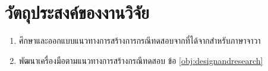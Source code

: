 \section{วัตถุประสงค์ของงานวิจัย}
\label{sec:objective}

\begin{enumerate}
    \item ศึกษาและออกแบบแนวทางการสร้างการกรณีทดสอบจาก{\TestPath}ที่ได้จาก{\scg}สำหรับภาษาจาวา\label{obj:designandresearch}
    \item พัฒนาเครื่องมือตามแนวทางการสร้างกรณีทดสอบ ข้อ \ref{obj:designandresearch}
\end{enumerate}

